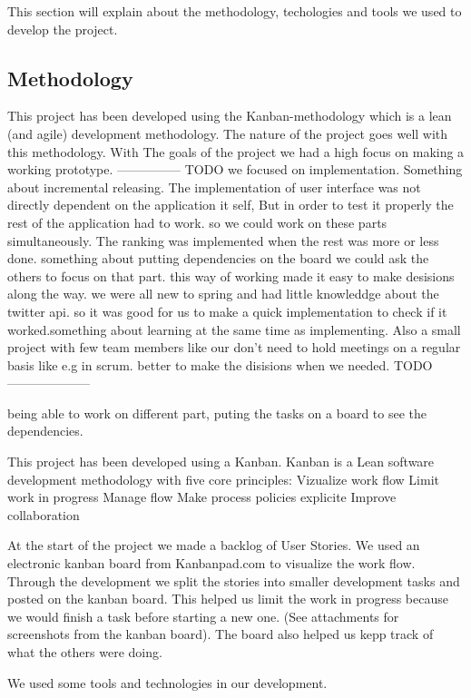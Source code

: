 This section will explain about the methodology, techologies and tools we used to develop the project. 
\subsection{Methodology}

This project has been developed using the Kanban-methodology which is a lean (and agile) development methodology. The nature of the project goes well with this methodology. With The goals of the project we had a high focus on making a working prototype. --------------- TODO we focused on implementation. Something about incremental releasing. The implementation of user interface was not directly dependent on the application it self,  But in order to test it properly the rest of the application had to work. so we could work on these parts simultaneously. The ranking was implemented when the rest was more or less done. something about putting dependencies on the board we could ask the others to focus on that part. 
this way of working made it easy to make desisions along the way. we were all new to spring and had little knowleddge about the twitter api. so it was good for us to make a quick implementation to check if it worked.something about learning at the same time as implementing. Also a small project with few team members like our don't need to hold meetings on a regular basis like e.g in scrum. better to make the disisions when we needed.  TODO --------------------


being able to work on different part, puting the tasks on a board to see the dependencies.

This project has been developed using a Kanban. Kanban is a Lean software development methodology with five core principles:
Vizualize work flow 
Limit work in progress 
Manage flow
Make process policies explicite
Improve collaboration

At the start of the project we made a backlog of User Stories. We used an electronic kanban board from Kanbanpad.com to visualize the work flow. Through the development we split the stories into smaller development tasks and posted on the kanban board. This helped us limit the work in progress because we would finish a task before starting a new one. (See attachments for screenshots from the kanban board). The board also helped us kepp track of what the others were doing.

We used some tools and technologies in our development. 

